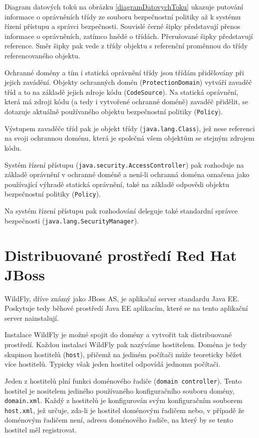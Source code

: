 Diagram datových toků na obrázku \ref{diagramDatovychToku} ukazuje putování informace o oprávněních třídy ze souboru bezpečnostní politiky až k systému řízení přístupu a správci bezpečnosti. Souvislé černé šipky představují přenos informace o oprávněních, zatímco hnědé o třídách. Přerušované šipky představují reference. Směr šipky pak vede z třídy objektu s referenční proměnnou do třídy referencovaného objektu.

Ochranné domény a tím i statická oprávnění třídy jsou třídám přidělovány při jejich zavádění. Objekty ochranných domén ({\tt ProtectionDomain}) vytváří zavaděč tříd a to na základě jejich zdroje kódu ({\tt CodeSource}). Na statická oprávnění, která má zdroji kódu (a tedy i vytvořené ochranné doméně) zavaděč přidělit, se dotazuje aktuálně používaného objektu bezpečnostní politiky ({\tt Policy}).

Výstupem zavaděče tříd pak je objekt třídy ({\tt java.lang.Class}), jež nese referenci na svoji ochrannou doménu, která je společná všem objektům se stejným zdrojem kódu.

Systém řízení přístupu ({\tt java.security.AccessController}) pak rozhoduje na základě oprávnění v ochranné doméně a není-li ochranná doména označena jako používající výhradě statická oprávnění, také na základě odpovědi objektu bezpečnostní politiky ({\tt Policy}).

Na systém řízení přístupu pak rozhodování deleguje také standardní správce bezpečnosti ({\tt java.lang.SecurityManager}).


\chapter{Distribuované prostředí Red Hat JBoss} \label{jboss}

WildFly, dříve známý jako JBoss AS, je aplikační server standardu Java EE. Poskytuje tedy běhové prostředí Java EE aplikacím, které se na tento aplikační server nainstalují.

Instalace WildFly je možné spojit do domény a vytvořit tak distribuované prostředí. Každou instalaci WildFly pak nazýváme hostitelem. Doména je tedy skupinou hostitelů ({\tt host}), přičemž na jediném počítači může teoreticky běžet více hostitelů. Typicky však jeden hostitel odpovídá jednomu počítači.

Jeden z hostitelů plní funkci doménového řadiče ({\tt domain controller}). Tento hostitel je nositelem jediného používaného konfiguračního souboru domény, {\tt domain.xml}. Každý z hostitelů je konfigurován svým konfiguračním souborem {\tt host.xml}, jež určuje, zda-li je hostitel doménovým řadičem nebo, v případě že doménovým řadičem není, adresu doménového řadiče, na který by se tento hostitel měl registrovat. \cite{jbossDomainSetup}


